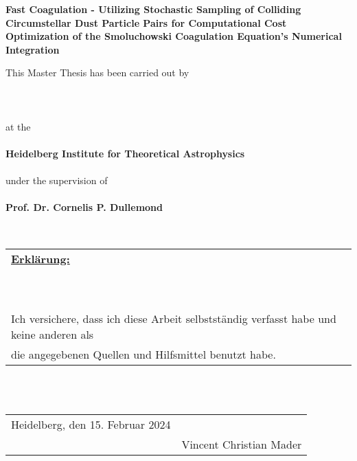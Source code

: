\begin{titlepage}
    \begin{center}
        \begin{Large}
            \textbf{
                Fast Coagulation - Utilizing Stochastic Sampling of Colliding Circumstellar Dust 
                Particle Pairs for Computational Cost Optimization of the Smoluchowski Coagulation 
                Equation's Numerical Integration
            }
        \end{Large}
        
        \vfill
        
        This Master Thesis has been carried out by 
        \\ \ \\
        \textbf{\theauthor} 
        \\ \ \\
        at the 
        \\ \ \\
        \textbf{Heidelberg Institute for Theoretical Astrophysics}
        \\ \ \\
        under the supervision of 
        \\ \ \\
        \textbf{Prof. Dr. Cornelis P. Dullemond}
    \end{center}
\end{titlepage}

\begin{titlepage}
    \ 
\end{titlepage}

\def\dotsign{\xleaders\hbox to .2em{\d{}}\hfill\d{}}

\begin{titlepage}
    \begin{tabular}{l}
        \textbf{\underline{Erklärung:}} \\
        \ \\
        \ \\
        Ich versichere, dass ich diese Arbeit selbstständig verfasst habe und keine anderen als \\ 
        die angegebenen Quellen und Hilfsmittel benutzt habe. \\
    \end{tabular}

        \ \\
        \ \\

    \begin{tabularx}{\textwidth}{l @{}p{10cm}@{}}
            Heidelberg, den 15. Februar 2024
        & 
            \hspace{10mm} \hrulefill 
        \\ 
        & 
            \hspace{10mm} Vincent Christian Mader 
    \end{tabularx}

\end{titlepage}

